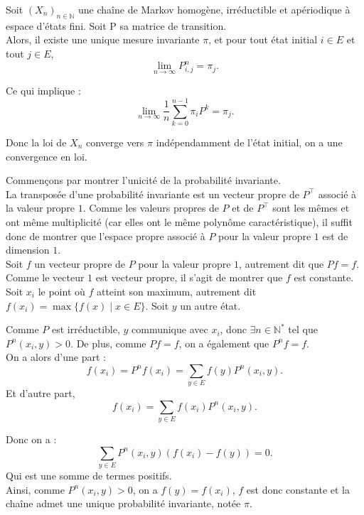 \documentclass{article}
\begin{document}
\begin{tcolorbox}[colback=white,colframe=red!80!black,title=Théorème de convergence]
Soit $(X_n)_{n \in \mathbb{N}}$ une chaîne de Markov homogène, irréductible et apériodique à espace d'états fini. Soit P sa matrice de transition.\\
Alors, il existe une unique mesure invariante $\pi$, et pour tout état initial $i \in E$ et tout $j \in E$,
\[
\lim_{n \to \infty} P^n_{i,j} = \pi_j.
\]

Ce qui implique :
\[
\lim_{n \to \infty} \frac{1}{n} \sum_{k=0}^{n-1} \pi_i P^k = \pi_j.
\]

Donc la loi de $X_n$ converge vers $\pi$ indépendamment de l'état initial, on a une convergence en loi.
\end{tcolorbox}

\begin{tcolorbox}[colback=white, colframe=green!80!black, title=Démonstration, breakable]
Commençons par montrer l'unicité de la probabilité invariante. \\

La transposée d'une probabilité invariante est un vecteur propre de $P^{\top}$ associé à la valeur propre $1$.
Comme les valeurs propres de $P$ et de $P^{\top}$ sont les mêmes et ont même multiplicité (car elles ont le même polynôme caractéristique), il suffit donc de montrer que l'espace propre associé à $P$ pour la valeur propre $1$ est de dimension $1$. \\

Soit $f$ un vecteur propre de $P$ pour la valeur propre $1$, autrement dit que $Pf = f$. Comme le vecteur $1$ est vecteur propre, il s'agit de montrer que $f$ est constante. \\

Soit $x_i$ le point où $f$ atteint son maximum, autrement dit $f(x_i) = \max\{f(x) \mid x \in E\}$. Soit $y$ un autre état.

Comme $P$ est irréductible, $y$ communique avec $x_i$, donc $\exists n \in \mathbb{N}^{*}$ tel que $P^n(x_i, y) > 0$. De plus, comme $Pf = f$, on a également que $P^n f = f$. \\

On a alors d'une part :
\[
f(x_i) = P^n f(x_i) = \sum_{y \in E} f(y) P^n(x_i, y).
\]
Et d'autre part,
\[
f(x_i) = \sum_{y \in E} f(x_i) P^n(x_i, y).
\]

Donc on a :
\[
\sum_{y \in E} P^n(x_i, y) \left(f(x_i) - f(y)\right) = 0.
\]
Qui est une somme de termes positifs. \\

Ainsi, comme $P^n(x_i, y) > 0$, on a $f(y) = f(x_i)$, $f$ est donc constante et la chaîne admet une unique probabilité invariante, notée $\pi$.
\end{tcolorbox}
\end{document}
